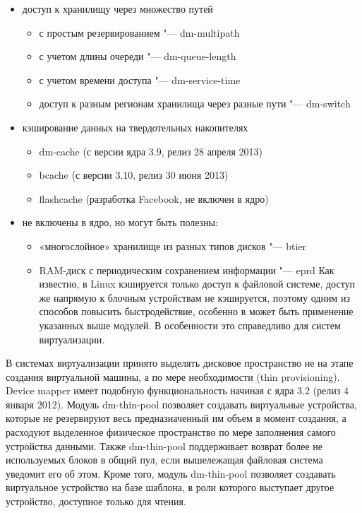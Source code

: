 \documentclass[10pt, a5paper]{article}
\begin{document}
\begin{itemize}
  \item доступ к хранилищу через множество путей\begin{itemize}
  \item с простым резервированием "--- dm-multipath
  \item с учетом длины очереди "--- dm-queue-length
  \item с учетом времени доступа "--- dm-service-time
  \item доступ к разным регионам хранилища через разные пути "--- dm-switch
\end{itemize}


  \item кэширование данных на твердотельных накопителях\begin{itemize}
  \item dm-cache (с версии ядра 3.9,  релиз 28 апреля 2013)
  \item bcache (с версии 3.10, релиз 30 июня 2013)
  \item flashcache (разработка Facebook, не включен в ядро)
\end{itemize}


  \item не включены в ядро, но могут быть полезны:\begin{itemize}
  \item «многослойное» хранилище из разных типов дисков "--- btier
  \item RAM-диск с периодическим сохранением информации "--- eprd
Как известно, в Linux кэшируется только доступ к файловой системе, доступ же напрямую к блочным устройствам не кэшируется, поэтому одним из способов повысить быстродействие, особенно в может быть применение указанных выше модулей. В особенности это справедливо для систем виртуализации.
\end{itemize}


\end{itemize}

В системах  виртуализации принято выделять дисковое пространство не на этапе создания виртуальной машины, а по мере необходимости (thin provisioning). Device mapper имеет подобную функциональность начиная с ядра 3.2 (релиз 4 января 2012). Модуль dm-thin-pool позволяет создавать виртуальные устройства, которые не резервируют весь предназначенный им объем в момент создания, а расходуют выделенное физическое пространство по мере заполнения самого устройства данными. Также dm-thin-pool поддерживает возврат более не используемых блоков в общий пул, если вышележащая файловая система уведомит его об этом. Кроме того, модуль dm-thin-pool  позволяет создавать виртуальное устройство на базе шаблона, в роли которого выступает другое устройство, доступное только для чтения.
\end{document}
